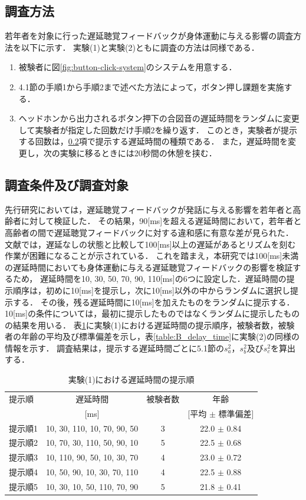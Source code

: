 \subsection{調査方法}
若年者を対象に行った遅延聴覚フィードバックが身体運動に与える影響の調査方法を以下に示す．
実験(1)と実験(2)ともに調査の方法は同様である．
\begin{enumerate}[leftmargin=*]
  \item 被験者に図\ref{fig:button-click-system}のシステムを用意する．
  \item 4.1節の手順1から手順2まで述べた方法によって，ボタン押し課題を実施する．
  \item ヘッドホンから出力されるボタン押下の合図音の遅延時間をランダムに変更して実験者が指定した回数だけ手順2を繰り返す．
  このとき，実験者が提示する回数は，\ref{subsec:Yobi-conditions}項で提示する遅延時間の種類である．
  また，遅延時間を変更し，次の実験に移るときには20秒間の休憩を挟む．
\end{enumerate}
\subsection{調査条件及び調査対象}
\label{subsec:Yobi-conditions}
先行研究\cite{kayama}においては，遅延聴覚フィードバックが発話に与える影響を若年者と高齢者に対して検証した．
その結果，90[ms]を超える遅延時間において，若年者と高齢者の間で遅延聴覚フィードバックに対する違和感に有意な差が見られた．
文献\cite{timing-music}では，遅延なしの状態と比較して100[ms]以上の遅延があるとリズムを刻む作業が困難になることが示されている．
これを踏まえ，本研究では100[ms]未満の遅延時間においても身体運動に与える遅延聴覚フィードバックの影響を検証するため，
遅延時間を10, 30, 50, 70, 90, 110[ms]の6つに設定した．遅延時間の提示順序は，初めに10[ms]を提示し，次に10[ms]以外の中からランダムに選択し提示する．
その後，残る遅延時間に10[ms]を加えたものをランダムに提示する．
10[ms]の条件については，最初に提示したものではなくランダムに提示したものの結果を用いる．
表\ref{table:A_delay_time}に実験(1)における遅延時間の提示順序，被験者数，被験者の年齢の平均及び標準偏差を示し，表\ref{table:B_delay_time}に実験(2)の同様の情報を示す．
調査結果は，提示する遅延時間ごとに5.1節の$s^2_{a}$，$s^2_{b}$及び$s^2_{c}$を算出する．
\begin{table}[btp]
  \caption{実験(1)における遅延時間の提示順}
  \label{table:A_delay_time}
  \centering
  \begin{tabular}{lccc}
    \hline
    提示順 & 遅延時間 & 被験者数 & 年齢\\
    　& [ms] & & [平均 $\pm$ 標準偏差]\\
    \hline \hline
    提示順1  & 10, 30, 110, 10, 70, 90, 50  & 3 & 22.0 $\pm$ 0.84\\
    提示順2  & 10, 70, 30, 110, 50, 90, 10  & 5 & 22.5 $\pm$ 0.68\\
    提示順3  & 10, 110, 90, 50, 10, 30, 70  & 4 & 23.0 $\pm$ 0.72\\
    提示順4  & 10, 50, 90, 10, 30, 70, 110  & 4 & 22.5 $\pm$ 0.88\\
    提示順5  & 10, 30, 10, 50, 110, 70, 90  & 5 & 21.8 $\pm$ 0.41
\\
    \hline
  \end{tabular}
\end{table}

